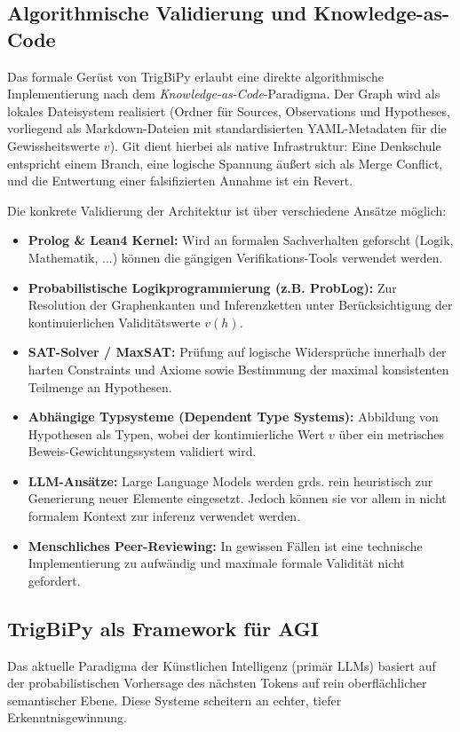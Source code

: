 \documentclass[11pt, a4paper]{article}
\begin{document}
	
	
	\subsection{Algorithmische Validierung und Knowledge-as-Code}
	Das formale Gerüst von TrigBiPy erlaubt eine direkte algorithmische Implementierung nach dem \emph{Knowledge-as-Code}-Paradigma. Der Graph wird als lokales Dateisystem realisiert (Ordner für Sources, Observations und Hypotheses, vorliegend als Markdown-Dateien mit standardisierten YAML-Metadaten für die Gewissheitswerte $v$). Git dient hierbei als native Infrastruktur: Eine Denkschule entspricht einem Branch, eine logische Spannung äußert sich als Merge Conflict, und die Entwertung einer falsifizierten Annahme ist ein Revert.
	
	Die konkrete Validierung der Architektur ist über verschiedene Ansätze möglich:
	\begin{itemize}
		\item \textbf{Prolog \& Lean4 Kernel:} Wird an formalen Sachverhalten geforscht (Logik, Mathematik, ...) können die gängigen Verifikations-Tools verwendet werden.
		\item \textbf{Probabilistische Logikprogrammierung (z.B. ProbLog):} Zur Resolution der Graphenkanten und Inferenzketten unter Berücksichtigung der kontinuierlichen Validitätswerte $v(h)$.
		\item \textbf{SAT-Solver / MaxSAT:} Prüfung auf logische Widersprüche innerhalb der harten Constraints und Axiome sowie Bestimmung der maximal konsistenten Teilmenge an Hypothesen.
		\item \textbf{Abhängige Typsysteme (Dependent Type Systems):} Abbildung von Hypothesen als Typen, wobei der kontinuierliche Wert $v$ über ein metrisches Beweis-Gewichtungssystem validiert wird.
		\item \textbf{LLM-Ansätze:} Large Language Models werden grds. rein heuristisch zur Generierung neuer Elemente eingesetzt. Jedoch können sie vor allem in nicht formalem Kontext zur inferenz verwendet werden.
		\item \textbf{Menschliches Peer-Reviewing:} In gewissen Fällen ist eine technische Implementierung zu aufwändig und maximale formale Validität nicht gefordert.
	\end{itemize}
	
	\subsection{TrigBiPy als Framework für AGI}
	Das aktuelle Paradigma der Künstlichen Intelligenz (primär LLMs) basiert auf der probabilistischen Vorhersage des nächsten Tokens auf rein oberflächlicher semantischer Ebene. Diese Systeme scheitern an echter, tiefer Erkenntnisgewinnung.
	
\end{document}
